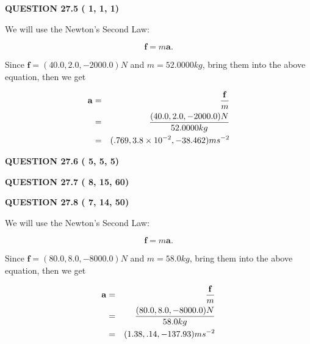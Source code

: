 \documentclass[12pt]{article}
\begin{document}
 
 
  
\vspace{0.2in}
  
{\textbf{\Large{QUESTION
27.5 
 (          1,          1,          1)
}}}
  
  


 
 

We will use the Newton's Second Law:
 
\[
\mathbf{f}=m\mathbf{a}.
\]
 
Since $\mathbf{f}= %
(40.0 , 2.0 , -2000.0) N$
and $m= %
52.0000kg$, bring them into the above equation, then we get
 
\begin{eqnarray*}
\mathbf{a}&=&\frac{\mathbf{f}}m  \\
&=&\frac{ %
(40.0 , 2.0 , -2000.0) N}{ %
52.0000kg}  \\
&=& %
(.769 , 3.8 \times 10^{-2} , -38.462) ms^{-2}
\end{eqnarray*}
 
 
 
  
\vspace{0.2in}
  
{\textbf{\Large{QUESTION
27.6 
 (          5,          5,          5)
}}}
  
  
  
\vspace{0.2in}
  
{\textbf{\Large{QUESTION
27.7 
 (          8,         15,         60)
}}}
  
  
 
 

 
 
  
\vspace{0.2in}
  
{\textbf{\Large{QUESTION
27.8 
 (          7,         14,         50)
}}}
  
  
 
 

We will use the Newton's Second Law:
 
\[
\mathbf{f}=m\mathbf{a}.
\]
 
Since $\mathbf{f}= %
(80.0 , 8.0 , -8000.0) N$
and $m= %
58.0kg$, bring them into the above equation, then we get
 
\begin{eqnarray*}
\mathbf{a}&=&\frac{\mathbf{f}}m  \\
&=&\frac{ %
(80.0 , 8.0 , -8000.0) N}{ %
58.0kg}  \\
&=& %
(1.38 , .14 , -137.93) ms^{-2}
\end{eqnarray*}
 
\end{document}
